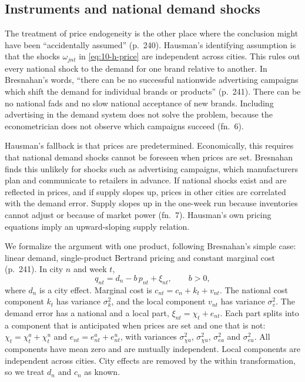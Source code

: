 \subsection{Instruments and national demand shocks}\label{sec:10-bresnahan-iv}

The treatment of price endogeneity is the other place where the conclusion might have been ``accidentally
assumed'' (p.~240). Hausman's identifying assumption is that the shocks $\omega_{jnt}$ in
\eqref{eq:10-h-price} are independent across cities. This rules out every national shock to the demand for
one brand relative to another. In Bresnahan's words, ``there can be no successful nationwide advertising
campaigns which shift the demand for individual brands or products'' (p.~241). There can be no national
fads and no slow national acceptance of new brands. Including advertising in the demand system does not
solve the problem, because the econometrician does not observe which campaigns succeed (fn.~6).

Hausman's fallback is that prices are predetermined. Economically, this requires that national demand shocks
cannot be foreseen when prices are set. Bresnahan finds this unlikely for shocks such as advertising
campaigns, which manufacturers plan and communicate to retailers in advance. If national shocks exist and
are reflected in prices, and if supply slopes up, prices in other cities are correlated with the demand
error. Supply slopes up in the one-week run because inventories cannot adjust or because of market power
(fn.~7). Hausman's own pricing equations imply an upward-sloping supply relation.

We formalize the argument with one product, following Bresnahan's simple case: linear demand, single-product
Bertrand pricing and constant marginal cost (p.~241). In city $n$ and week $t$,
\begin{equation}\label{eq:10-b-demand}
  q_{nt} = d_n - b\,p_{nt} + \xi_{nt}, \qquad b > 0,
\end{equation}
where $d_n$ is a city effect. Marginal cost is $c_{nt} = c_n + k_t + v_{nt}$. The national cost component
$k_t$ has variance $\sigma_k^2$, and the local component $v_{nt}$ has variance $\sigma_v^2$. The demand error
has a national and a local part, $\xi_{nt} = \chi_t + e_{nt}$. Each part splits into a component that is
anticipated when prices are set and one that is not: $\chi_t = \chi^a_t + \chi^u_t$ and
$e_{nt} = e^a_{nt} + e^u_{nt}$, with variances $\sigma_{\chi a}^2$, $\sigma_{\chi u}^2$, $\sigma_{ea}^2$ and
$\sigma_{eu}^2$. All components have mean zero and are mutually independent. Local components are
independent across cities. City effects are removed by the within transformation, so we treat $d_n$ and
$c_n$ as known.

